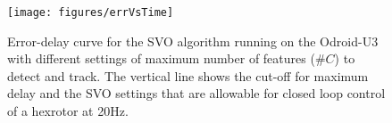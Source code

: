 \begin{figure}[t]
\centering
\texttt{[image: figures/errVsTime]}
\caption{Error-delay curve for the SVO algorithm running on the Odroid-U3 with different settings of maximum number of features ($\#C$) to detect and track. The vertical line shows the cut-off for maximum delay and the SVO settings that are allowable for closed loop control of a hexrotor at 20Hz.}
\label{fig:svo_error_delay}
\end{figure}

